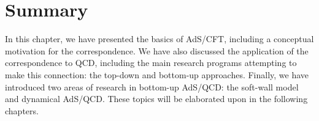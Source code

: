 \section{Summary}
In this chapter, we have presented the basics of AdS/CFT, including a conceptual motivation for the correspondence.
We have also discussed the application of the correspondence to QCD, including the main research programs attempting to make this connection: the top-down and bottom-up approaches. 
Finally, we have introduced two areas of research in bottom-up AdS/QCD: the soft-wall model and dynamical AdS/QCD. 
These topics will be elaborated upon in the following chapters.

